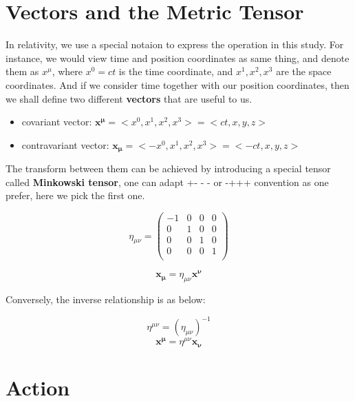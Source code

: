 \documentclass[12pt]{article}
\begin{document}
\section{Vectors and the Metric Tensor}

In relativity, we use a special notaion to express the operation in this study. For instance, we would view time and position coordinates as same thing, and denote them as $x^{\mu}$, where $x^0 = ct$ is the time coordinate, and $x^1, x^2, x^3$ are the space coordinates. 
And if we consider time together with our position coordinates, then we shall define two different \textbf{vectors} that are useful to us.

\begin{itemize}
    \item covariant vector: $\mathbf{x^{\mu}} = <x^0, x^1, x^2, x^3> = <ct, x, y, z>$
    \item contravariant vector: $\mathbf{x_{\mu}} = <-x^0, x^1, x^2, x^3> = <-ct, x, y, z>$
\end{itemize}

The transform between them can be achieved by introducing a special tensor called \textbf{Minkowski tensor}, one can adapt +- - - or -+++ convention as one prefer, here we pick the first one. 

\begin{center}
    \[ \eta_{\mu \nu} = 
    \begin{pmatrix}
        -1&0&0&0\\
        0&1&0&0\\
        0&0&1&0\\
        0&0&0&1\\
    \end{pmatrix} \]
\end{center}

\begin{center}
    \[ \mathbf{x_{\mu}} = \eta_{\mu \nu} \mathbf{x^{\nu}} \]
\end{center}

Conversely, the inverse relationship is as below:

\begin{center}
    \[ \eta^{\mu \nu} = (\eta_{\mu \nu})^{-1}\]
    \[ \mathbf{x^{\mu}} = \eta^{\mu \nu} \mathbf{x_{\nu}} \]
\end{center}

\section{Action}
\end{document}
